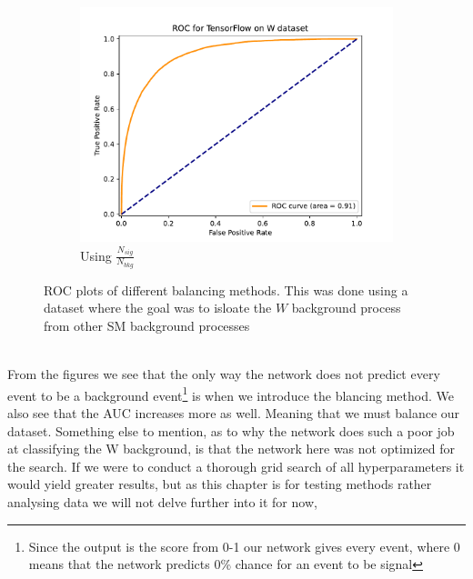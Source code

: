 \documentclass[12pt, a4paper]{book}
\begin{document}
\begin{figure}[!ht]
\begin{subfigure}[b]{0.49\textwidth}
         \centering
         \includegraphics[width=1\textwidth]{Balanced/ROC.pdf}
         \caption{Using $\frac{N_{sig}}{N_{bkg}}$}\label{fig:WROCW}
      \end{subfigure}
      \caption[ROC plots for different balancing methods on NN]{ROC plots of different balancing methods. 
      This was done using a dataset where the goal was to isloate the $W$ background process from other SM background processes}\label{fig:WROC}
\end{figure}
\\From the figures we see that the only way the network does not predict every event to be a background event\footnote{Since the output is the score from 0-1 our network gives every event, where 0 means that the network predicts 0\% chance for an event to be signal} is when we introduce the blancing method. We also see that the AUC increases more as well. Meaning that we must balance our dataset. 
Something else to mention, as to why the network does such a poor job at classifying the W background, is that the network here was not optimized for the search. If we were to conduct a thorough grid search of all hyperparameters it would yield greater results, but as this chapter is for testing methods rather analysing data we will not delve further into it for now,

\clearpage
\end{document}

